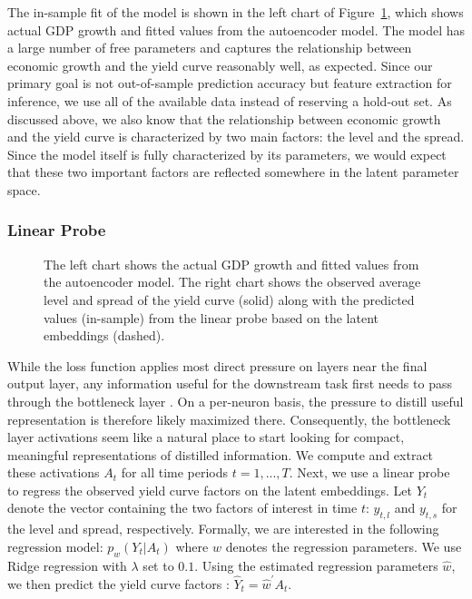 The in-sample fit of the model is shown in the left chart of Figure~\ref{fig-dl-results}, which shows actual GDP growth and fitted values from the autoencoder
model. The model has a large number of free parameters and captures the relationship between economic growth and the yield curve reasonably well, as expected. Since our primary goal is not out-of-sample prediction accuracy but feature extraction for inference, we use all of the available data instead of reserving a hold-out set. As discussed above, we also know that the relationship between economic growth and the yield curve is characterized by two main factors: the level and the spread. Since the model itself is fully characterized by its parameters, we would expect that these two important factors are reflected somewhere in the latent parameter space. 

\subsubsection{Linear Probe}\label{linear-probe}

\begin{figure}


\caption{\label{fig-dl-results}The left chart shows the actual GDP growth
and fitted values from the autoencoder model. The right chart shows the
observed average level and spread of the yield curve (solid) along with
the predicted values (in-sample) from the linear probe based on the latent embeddings
(dashed).}

\end{figure}%

While the loss function applies most direct pressure on layers near the final output layer, any information useful for the downstream task first needs to pass through the bottleneck layer \citep{alain2018understanding}. On a per-neuron basis, the pressure to distill useful representation is therefore likely maximized there. Consequently, the bottleneck layer activations seem like a natural place to start looking for compact, meaningful representations of distilled information.  We compute and extract these activations \(A_t\) for all time periods \(t=1,...,T\). Next, we use a linear probe to regress the observed
yield curve factors on the latent embeddings. Let \(Y_t\) denote the vector containing the two factors of interest in time \(t\): \(y_{t,l}\) and \(y_{t,s}\) for the level and spread, respectively. Formally, we are interested in the following regression model: \(p_{w}(Y_t|A_t)\) where \(w\) denotes the regression
parameters. We use Ridge regression with \(\lambda\) set to \(0.1\). Using the estimated regression parameters \(\hat{w}\), we then predict the yield curve factors%
: \(\hat{Y}_t=\hat{w}^{\prime}A_t\).

